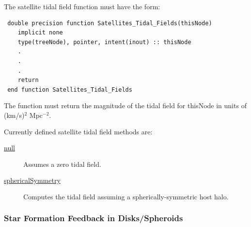 The satellite tidal field function must have the form:
\begin{verbatim}
 double precision function Satellites_Tidal_Fields(thisNode)
    implicit none
    type(treeNode), pointer, intent(inout) :: thisNode
    .
    .
    .
    return
 end function Satellites_Tidal_Fields
\end{verbatim}
The function must return the magnitude of the tidal field for {\normalfont \ttfamily thisNode} in units of (km/s)$^2$ Mpc$^{-2}$.

Currently defined satellite tidal field methods are:
\begin{description}
 \item [\hyperlink{satellites.tidal_fields.null.F90:satellites_tidal_fields_null}{{\normalfont \ttfamily null}}] Assumes a zero tidal field.
 \item [\hyperlink{satellites.tidal_fields.spherical_symmetry.F90:satellites_tidal_fields_spherical_symmetry}{{\normalfont \ttfamily sphericalSymmetry}}] Computes the tidal field assuming a spherically-symmetric host halo.
\end{description}

\subsubsection{Star Formation Feedback in Disks/Spheroids}

